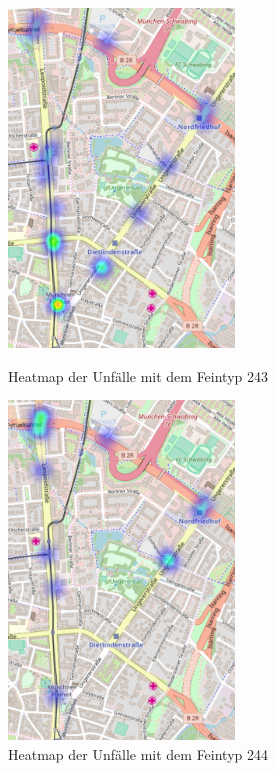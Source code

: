 \begin{figure}[htb]
	\centering
	\begin{minipage}[t]{0.45\linewidth}
		\centering
		\includegraphics[width=6cm,height=9cm]{figures/HM_243}
		\caption{Heatmap der Unfälle mit dem Feintyp 243}\label{fig:Heatmap_243}
	\end{minipage}%
	\hfill
	\begin{minipage}[t]{0.45\linewidth}
		\centering
		\includegraphics[width=6cm,height=9cm]{figures/HM_244}
		\caption{Heatmap der Unfälle mit dem Feintyp 244}\label{fig:Heatmap_244}
	\end{minipage}
\end{figure}

